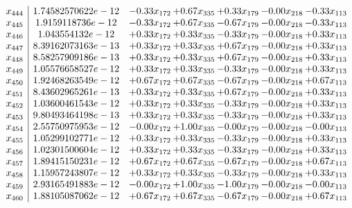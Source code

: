 \documentclass[8pt]{article}
\begin{document}
\[\begin{array}{c| c c@{\hskip 2pt} c@{\hskip 2pt} c@{\hskip 2pt} c@{\hskip 2pt} c@{\hskip 2pt} }
 x_{444}   &  1.74582570622e-12 & -0.33 x_{172} & +  0.67 x_{335} & +  0.33 x_{179} & -0.00 x_{218} & -0.33 x_{113}\\
 x_{445}   &  1.9159118736e-12 & -0.33 x_{172} & +  0.67 x_{335} & -0.67 x_{179} & -0.00 x_{218} & -0.33 x_{113}\\
 x_{446}   &  1.043554132e-12 & +  0.33 x_{172} & +  0.33 x_{335} & -0.33 x_{179} & -0.00 x_{218} & +  0.33 x_{113}\\
 x_{447}   &  8.39162073163e-13 & +  0.33 x_{172} & +  0.33 x_{335} & +  0.67 x_{179} & -0.00 x_{218} & +  0.33 x_{113}\\
 x_{448}   &  8.58257909186e-13 & +  0.33 x_{172} & +  0.33 x_{335} & +  0.67 x_{179} & -0.00 x_{218} & +  0.33 x_{113}\\
 x_{449}   &  1.05576658527e-12 & +  0.33 x_{172} & +  0.33 x_{335} & -0.33 x_{179} & -0.00 x_{218} & +  0.33 x_{113}\\
 x_{450}   &  1.92468263549e-12 & +  0.67 x_{172} & +  0.67 x_{335} & -0.67 x_{179} & -0.00 x_{218} & +  0.67 x_{113}\\
 x_{451}   &  8.43602965261e-13 & +  0.33 x_{172} & +  0.33 x_{335} & +  0.67 x_{179} & -0.00 x_{218} & +  0.33 x_{113}\\
 x_{452}   &  1.03600461543e-12 & +  0.33 x_{172} & +  0.33 x_{335} & -0.33 x_{179} & -0.00 x_{218} & +  0.33 x_{113}\\
 x_{453}   &  9.80493464198e-13 & +  0.33 x_{172} & +  0.33 x_{335} & -0.33 x_{179} & -0.00 x_{218} & +  0.33 x_{113}\\
 x_{454}   &  2.55750975953e-12 & -0.00 x_{172} & +  1.00 x_{335} & -0.00 x_{179} & -0.00 x_{218} & -0.00 x_{113}\\
 x_{455}   &  1.05299102771e-12 & +  0.33 x_{172} & +  0.33 x_{335} & -0.33 x_{179} & -0.00 x_{218} & +  0.33 x_{113}\\
 x_{456}   &  1.02301500604e-12 & +  0.33 x_{172} & +  0.33 x_{335} & -0.33 x_{179} & -0.00 x_{218} & +  0.33 x_{113}\\
 x_{457}   &  1.89415150231e-12 & +  0.67 x_{172} & +  0.67 x_{335} & -0.67 x_{179} & -0.00 x_{218} & +  0.67 x_{113}\\
 x_{458}   &  1.15957243807e-12 & +  0.33 x_{172} & +  0.33 x_{335} & -0.33 x_{179} & -0.00 x_{218} & +  0.33 x_{113}\\
 x_{459}   &  2.93165491883e-12 & -0.00 x_{172} & +  1.00 x_{335} & -1.00 x_{179} & -0.00 x_{218} & -0.00 x_{113}\\
 x_{460}   &  1.88105087062e-12 & +  0.67 x_{172} & +  0.67 x_{335} & -0.67 x_{179} & -0.00 x_{218} & +  0.67 x_{113}\\

\end{array}\]
\end{document}
